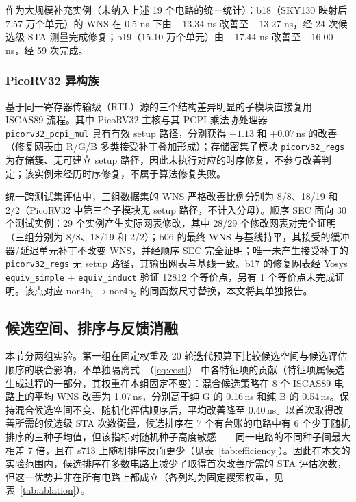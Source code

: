 \documentclass[twocolumn,10pt,fontset=windows]{ctexart}
\renewcommand{\eqref}[1]{\textup{（\ref{#1}）}}
\begin{document}
作为大规模补充实例（未纳入上述 19 个电路的统一统计）：b18（SKY130 映射后 7.57 万个单元）的 WNS 在 0.5 ns 下由 $-13.34$ ns 改善至 $-13.27$ ns，经 24 次候选级 STA 测量完成修复；b19（15.10 万个单元）由 $-17.44$ ns 改善至 $-16.00$ ns，经 59 次完成。

\subsubsection{PicoRV32 异构族}

基于同一寄存器传输级（RTL）源的三个结构差异明显的子模块直接复用 ISCAS89 流程。其中 PicoRV32 主核与其 PCPI 乘法协处理器 \texttt{picorv32\_pcpi\_mul} 具有有效 setup 路径，分别获得 $+1.13$ 和 $+0.07\,$ns 的改善（修复网表由 R/G/B 多类接受补丁叠加形成）；存储密集子模块 \texttt{picorv32\_regs} 为存储簇、无可建立 setup 路径，因此未执行对应的时序修复，不参与改善判定；该实例未经历时序修复，不属于算法修复失败。

统一跨测试集评估中，三组数据集的 WNS 严格改善比例分别为 8/8、18/19 和 2/2（PicoRV32 中第三个子模块无 setup 路径，不计入分母）。顺序 SEC 面向 30 个测试实例：29 个实例产生实际网表修改，其中 28/29 个修改网表对完全证明（三组分别为 8/8、18/19 和 2/2）；b06 的最终 WNS 与基线持平，其接受的缓冲器/延迟单元补丁不改变 WNS，并经顺序 SEC 完全证明；唯一未产生接受补丁的 \texttt{picorv32\_regs} 无 setup 路径，其输出网表与基线一致。b17 的修复网表经 Yosys \texttt{equiv\_simple} + \texttt{equiv\_induct} 验证 12812 个等价点，另有 1 个等价点未完成证明。该点对应 nor4b$_1\!\to\!$nor4b$_2$ 的同函数尺寸替换，本文将其单独报告。

\subsection{候选空间、排序与反馈消融}\label{sec:ablation}

本节分两组实验。第一组在固定权重及 20 轮迭代预算下比较候选空间与候选评估顺序的联合影响，不单独隔离式~\eqref{eq:cost} 中各特征项的贡献（特征项属候选生成过程的一部分，其权重在本组固定不变）：混合候选策略在 8 个 ISCAS89 电路上的平均 WNS 改善为 1.07\,ns，分别高于纯 G 的 0.16\,ns 和纯 B 的 0.54\,ns。保持混合候选空间不变、随机化评估顺序后，平均改善降至 0.40\,ns。以首次取得改善所需的候选级 STA 次数衡量，候选排序在 7 个有台账的电路中有 6 个少于随机排序的三种子均值，但该指标对随机种子高度敏感——同一电路的不同种子间最大相差 7 倍，且在 s713 上随机排序反而更少（见表~\ref{tab:efficiency}）。因此在本文的实验范围内，候选排序在多数电路上减少了取得首次改善所需的 STA 评估次数，但这一优势并非在所有电路上都成立（各列均为固定搜索权重，见表~\ref{tab:ablation}）。
\end{document}
